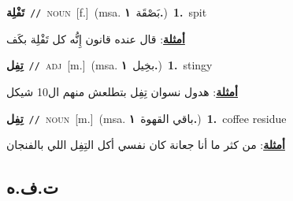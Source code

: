 \documentclass[10pt,a4paper,twoside]{article} %
\begin{document}
\begin{multicols}{2}
{{{{{{{{{{{{\setlength\topsep{0pt}\textbf{\foreignlanguage{arabic}{تَفْلِة}}\ {\color{gray}\texttt{//}\color{black}}\ \textsc{noun}\ [f.]\ \color{gray}(msa. \foreignlanguage{arabic}{بَصْقَة}~\foreignlanguage{arabic}{\textbf{١.}})\color{black}\ \textbf{1.}~spit\  \begin{flushright}\color{gray}\foreignlanguage{arabic}{\textbf{\underline{\foreignlanguage{arabic}{أمثلة}}}: قال عنده قانون إِنُّه كل تَفْلِة بكَف}\end{flushright}\color{black}} \vspace{2mm}

{\setlength\topsep{0pt}\textbf{\foreignlanguage{arabic}{تِفِل}}\ {\color{gray}\texttt{//}\color{black}}\ \textsc{adj}\ [m.]\ \color{gray}(msa. \foreignlanguage{arabic}{بخِيل}~\foreignlanguage{arabic}{\textbf{١.}})\color{black}\ \textbf{1.}~stingy\  \begin{flushright}\color{gray}\foreignlanguage{arabic}{\textbf{\underline{\foreignlanguage{arabic}{أمثلة}}}: هدول نسوان تِفِل بتطلعش منهم ال10 شيكل}\end{flushright}\color{black}} \vspace{2mm}

{\setlength\topsep{0pt}\textbf{\foreignlanguage{arabic}{تِفِل}}\ {\color{gray}\texttt{//}\color{black}}\ \textsc{noun}\ [m.]\ \color{gray}(msa. \foreignlanguage{arabic}{باقي القهوة}~\foreignlanguage{arabic}{\textbf{١.}})\color{black}\ \textbf{1.}~coffee residue\  \begin{flushright}\color{gray}\foreignlanguage{arabic}{\textbf{\underline{\foreignlanguage{arabic}{أمثلة}}}: من كثر ما أنا جعانة كان نفسي أكل التِفِل اللي بالفنجان}\end{flushright}\color{black}} \vspace{2mm}

\vspace{-3mm}
\subsection*{\color{blue}\foreignlanguage{arabic}{ت.ف.ه}\color{blue}{}} 

}}}}}}}}}}}
\end{multicols}
\end{document}
